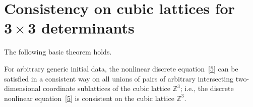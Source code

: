 \section[Consistency on cubic lattices for $3 \times 3$ determinants]{Consistency on cubic lattices for $\boldsymbol{3 \times 3}$ determinants}




The following basic theorem holds.



\begin{theorem}[\cite{1}] \label{theorem1}
For arbitrary generic initial data, the
nonlinear discrete equation~\eqref{5} can be satisfied in a
consistent way on all unions of pairs of arbitrary intersecting
two-dimensional coordinate sublattices of the cubic lattice
$\mathbb{Z}^3$; i.e., the discrete nonlinear equation~\eqref{5}
is consistent on the cubic lattice $\mathbb{Z}^3$.
\end{theorem}



